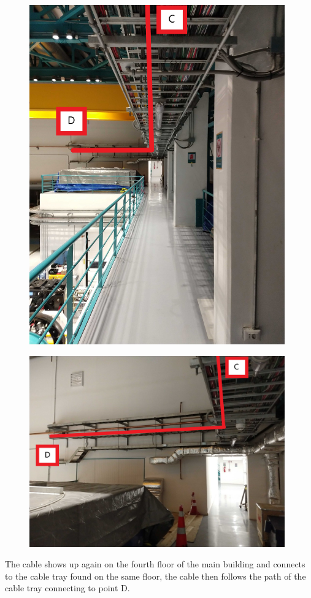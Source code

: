 \begin{figure}
  \includegraphics[width=11cm]{images/15.jpg}
  \centering
  \label{fig:jlsimon}
\end{figure}

\begin{figure}
  \includegraphics[width=11cm]{images/16.jpg}
  \centering
  \label{fig:jlsimon}
\end{figure}

The cable shows up again on the fourth floor of the main building and connects to the cable tray found on the same floor, the cable then follows the path of the cable tray connecting to point D.

